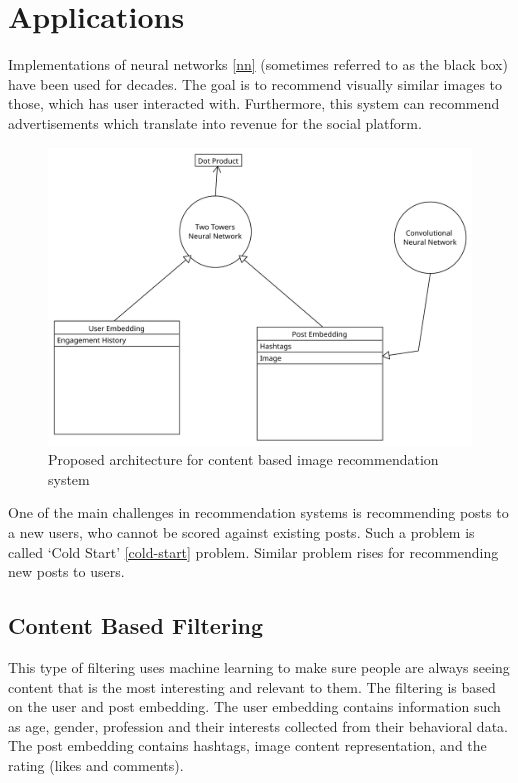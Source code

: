 \section{Applications} \label{applications}

Implementations of neural networks \ref{nn} (sometimes referred to as the black box) have been used for decades. The goal is to recommend visually similar images to those, which has user interacted with. Furthermore, this system can recommend advertisements which translate into revenue for the social platform. 

\begin{figure}[H]
    \centering
    \includegraphics[width=0.7\linewidth]{Diagrams/architecture.pdf}
    \caption{Proposed architecture for content based image recommendation system}
    \label{fig:proposed-alogrithm}
\end{figure}

One of the main challenges in recommendation systems is recommending posts to a new users, who cannot be scored against existing posts. Such a problem is called ‘Cold Start' \ref{cold-start} problem. \cite{10373857} Similar problem rises for recommending new posts to users.

\subsection{Content Based Filtering}\label{applications/content-based-filtering}

This type of filtering uses machine learning to make sure people are always seeing content that is the most interesting and relevant to them. \cite{ig-new-content} The filtering is based on the user and post embedding. The user embedding contains information such as age, gender, profession and their interests collected from their behavioral data. The post embedding contains hashtags, image content representation, and the rating (likes and comments).

